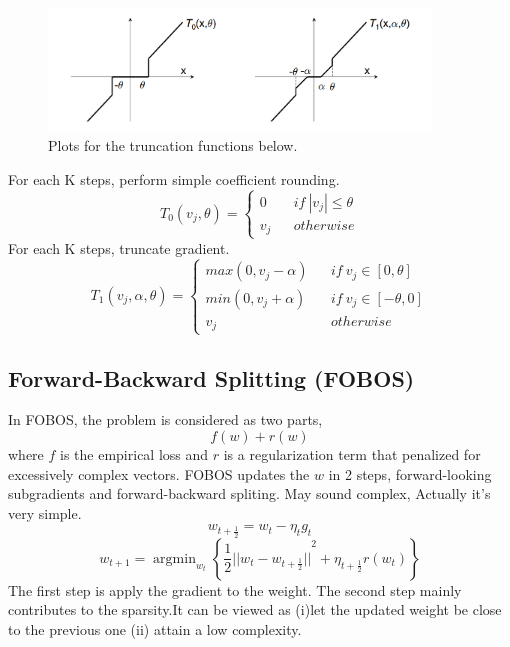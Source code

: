 \documentclass{article}
\begin{document}
\begin{figure}[h]
\centering
\includegraphics[width=4in,height=1.3in]{figure1}
\caption{Plots for the truncation functions below.}
\end{figure}

\noindent
For each K steps, perform simple coefficient rounding.
$$ T_{0}(v_{j},\theta)=\left\{
\begin{array}{lcl}
0       &      & {if \  \left| v_{j} \right| \leq \theta}\\
v_{j}     &      & {otherwise}
\end{array} \right. $$
For each K steps, truncate gradient.
$$ T_{1}(v_{j},\alpha,\theta)=\left\{  
\begin{array}{lcl}
max(0,v_{j}-\alpha)       &      & {if \ v_{j} \in [0,\theta]} \\
min(0,v_{j}+\alpha)       &      & {if \ v_{j} \in [-\theta,0]} \\
v_{j}     &      & {otherwise}
\end{array} \right. $$
\subsection{Forward-Backward Splitting (FOBOS)}
In FOBOS\cite{DBLP:journals/jmlr/DuchiS09}, the problem is considered as two parts,
$$f(w)+r(w)$$
where $f$ is the empirical loss and $r$ is a regularization term that penalized for excessively complex vectors.
FOBOS updates the $w$ in 2 steps, forward-looking subgradients and forward-backward spliting. May sound complex, Actually it's very simple. 
$$w_{t+\frac{1}{2}}=w_{t}-\eta_{t} g_{t}$$
$$w_{t+1}=\mathop{\arg\min}_{w_{t}} \left \{ {\frac{1}{2} || w_{t}-w_{t+\frac{1}{2}}||}^{2}+\eta_{t+\frac{1}{2}}r(w_{t}) \right \} $$
The first step is apply the gradient to the weight. The second step mainly contributes to the sparsity.It can be viewed as (\textrm{i})let the updated weight be close to the previous one (\textrm{ii}) attain a low complexity.
\end{document}
